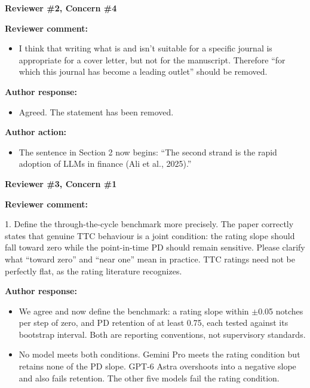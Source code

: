 \documentclass[11pt]{article}
\newcommand{\rvcomment}[1]{{\color{ReviewerGreen}#1}}
\newcommand{\concern}[1]{\textbf{\color{ReviewerGreen}#1}}
\begin{document}
\vspace{12pt}
\concern{Reviewer \#2, Concern \#4}

\concern{Reviewer comment:}

\begin{itemize}\color{ReviewerGreen}

\item \rvcomment{I think that writing what is and isn't suitable for a specific journal is appropriate for a cover letter, but not for the manuscript. Therefore ``for which this journal has become a leading outlet'' should be removed.}

\end{itemize}

\textbf{Author response:}

\begin{itemize}

\item Agreed. The statement has been removed.

\end{itemize}

\textbf{Author action:}

\begin{itemize}

\item The sentence in Section 2 now begins: ``The second strand is the rapid adoption of LLMs in finance (Ali et al., 2025).''

\end{itemize}

\vspace{12pt}
\concern{Reviewer \#3, Concern \#1}

\concern{Reviewer comment:}

\rvcomment{1. Define the through-the-cycle benchmark more precisely. The paper correctly states that genuine TTC behaviour is a joint condition: the rating slope should fall toward zero while the point-in-time PD should remain sensitive. Please clarify what ``toward zero'' and ``near one'' mean in practice. TTC ratings need not be perfectly flat, as the rating literature recognizes.}

\textbf{Author response:}

\begin{itemize}

\item We agree and now define the benchmark: a rating slope within $\pm$0.05 notches per step of zero, and PD retention of at least 0.75, each tested against its bootstrap interval. Both are reporting conventions, not supervisory standards.

\item No model meets both conditions. Gemini Pro meets the rating condition but retains none of the PD slope. GPT-6 Astra overshoots into a negative slope and also fails retention. The other five models fail the rating condition.

\end{itemize}
\end{document}
